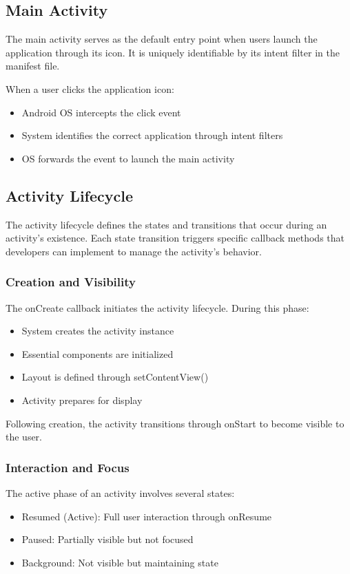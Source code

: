 \documentclass{article}
\begin{document}
\subsection{Main Activity}
The main activity serves as the default entry point when users launch the application through its icon. It is uniquely identifiable by its intent filter in the manifest file. 

When a user clicks the application icon:
\begin{itemize}
    \item Android OS intercepts the click event
    \item System identifies the correct application through intent filters
    \item OS forwards the event to launch the main activity
\end{itemize}

\subsection{Activity Lifecycle}
The activity lifecycle defines the states and transitions that occur during an activity's existence. Each state transition triggers specific callback methods that developers can implement to manage the activity's behavior.

\subsubsection{Creation and Visibility}
The onCreate callback initiates the activity lifecycle. During this phase:
\begin{itemize}
    \item System creates the activity instance
    \item Essential components are initialized
    \item Layout is defined through setContentView()
    \item Activity prepares for display
\end{itemize}

Following creation, the activity transitions through onStart to become visible to the user.

\subsubsection{Interaction and Focus}
The active phase of an activity involves several states:

\begin{itemize}
    \item Resumed (Active): Full user interaction through onResume
    \item Paused: Partially visible but not focused
    \item Background: Not visible but maintaining state
\end{itemize}
\end{document}
